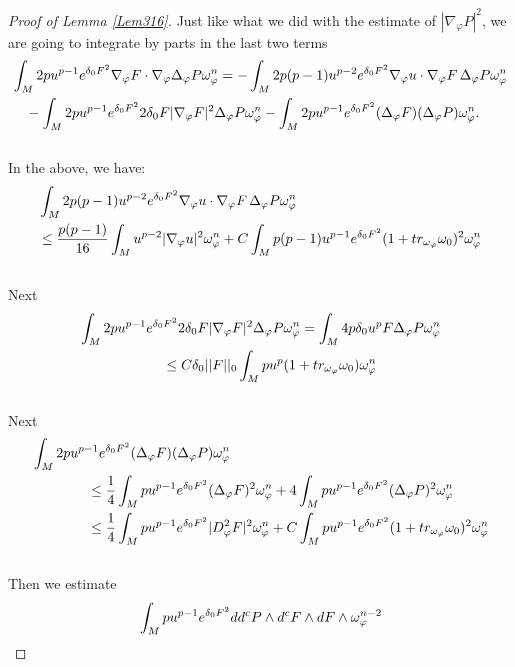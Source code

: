 \documentclass[11pt]{amsart}
\numberwithin{equation}{section}
\begin{document}
\begin{proof}[Proof of Lemma \ref{Lem316}]
Just like what  we did with the estimate of $|\nabla_\varphi P|^2$, we are going to integrate by parts in the last two terms
\begin{align}
	& \int_M2pu^{p-1}e^{\delta_0 F^2}\nabla_{\varphi}F \cdot \nabla_{\varphi}\Delta_{\varphi}P\omega_{\varphi}^n = - \int_M2p(p-1)u^{p-2}e^{\delta_0 F^2}\nabla_{\varphi}u\cdot \nabla_{\varphi}F\, \Delta_{\varphi}P\omega_{\varphi}^n \notag \\
	&\quad - \int_M2pu^{p-1}e^{\delta_0 F^2}2\delta_0 F |\nabla_{\varphi}F|^2 \Delta_{\varphi}P\omega_{\varphi}^n - \int_M2pu^{p-1}e^{\delta_0 F^2}(\Delta_{\varphi}F)(\Delta_{\varphi}P)\omega_{\varphi}^n.
\end{align}\\
In the above,  we have:
\begin{align}
	&\int_M2p(p-1)u^{p-2}e^{\delta_0 F^2}\nabla_{\varphi}u\cdot \nabla_{\varphi}F\, \Delta_{\varphi}P\omega_{\varphi}^n \notag \\
	&\le  \frac{p(p-1)}{16}\int_Mu^{p-2}|\nabla_{\varphi}u|^2\omega_{\varphi}^n +C\int_M p(p-1)u^{p-1}e^{\delta_0 F^2}(1+tr_{\omega_{\varphi}}\omega_0)^2\omega_{\varphi}^n 
\end{align}\\
Next
\begin{align}
	& \int_M2pu^{p-1}e^{\delta_0 F^2}2\delta_0 F |\nabla_{\varphi}F|^2 \Delta_{\varphi}P\omega_{\varphi}^n = \int_M 4p\delta_0 u^p F\Delta_\varphi P\omega_\varphi^n \notag\\
	&\qquad\qquad\qquad \le  C\delta_0||F||_0 \int_M pu^p  (1+tr_{\omega_{\varphi}}\omega_0)\omega_\varphi^n 
\end{align}\\
Next
\begin{align}
	& \int_M2pu^{p-1}e^{\delta_0 F^2}(\Delta_{\varphi}F)(\Delta_{\varphi}P)\omega_{\varphi}^n \notag\\
	&\qquad\qquad \le  \frac{1}{4} \int_M pu^{p-1}e^{\delta_0 F^2}(\Delta_{\varphi}F)^2\omega_{\varphi}^n + 4\int_M pu^{p-1}e^{\delta_0 F^2}(\Delta_{\varphi}P)^2\omega_{\varphi}^n \notag\\
	&\qquad\qquad \le  \frac{1}{4} \int_M pu^{p-1}e^{\delta_0 F^2}|D_\varphi^2 F|^2 \omega_{\varphi}^n + C\int_M pu^{p-1}e^{\delta_0 F^2}(1+tr_{\omega_{\varphi}}\omega_0)^2\omega_{\varphi}^n 
\end{align}\\
Then we estimate 
\begin{align}
	&\int_M pu^{p-1}e^{\delta_0 F^2}dd^c P\wedge d^c F\wedge d F\wedge \omega_{\varphi}^{n-2} \notag \\

\end{align}
\end{proof}
\end{document}
